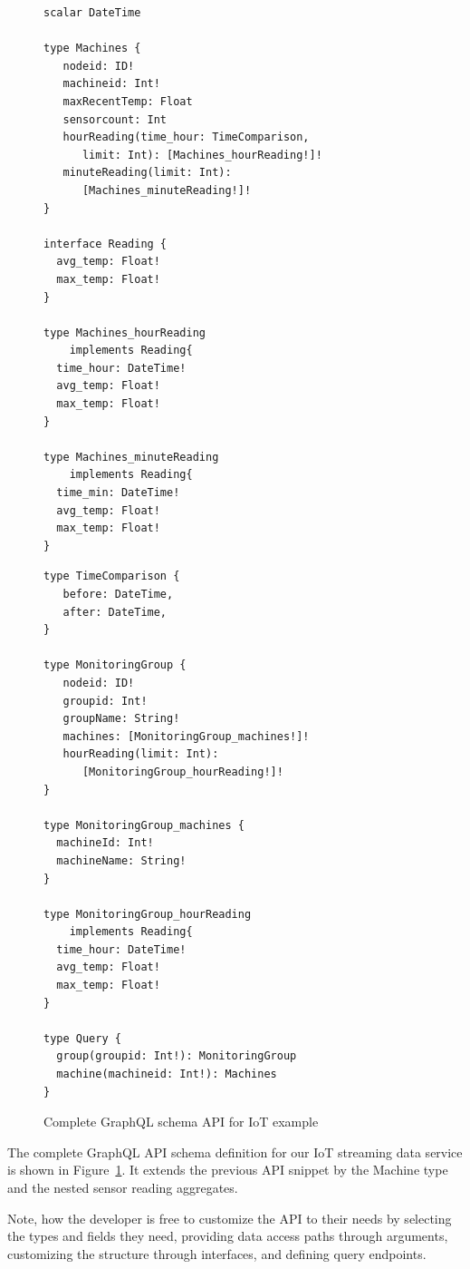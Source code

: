 \documentclass[	DIV=calc,%
							paper=letter,%
							fontsize=11pt,%
							twocolumn]{scrartcl}	 					%
\begin{document}
\begin{figure}[!ht]
    \begin{minipage}[l]{1.0\columnwidth}
        \centering
        \begin{lstlisting}
scalar DateTime

type Machines {
   nodeid: ID!
   machineid: Int!
   maxRecentTemp: Float
   sensorcount: Int
   hourReading(time_hour: TimeComparison,
      limit: Int): [Machines_hourReading!]!
   minuteReading(limit: Int):
      [Machines_minuteReading!]!
}

interface Reading {
  avg_temp: Float!
  max_temp: Float!
}

type Machines_hourReading
    implements Reading{
  time_hour: DateTime!
  avg_temp: Float!
  max_temp: Float!
}

type Machines_minuteReading
    implements Reading{
  time_min: DateTime!
  avg_temp: Float!
  max_temp: Float!
}
    \end{lstlisting}
    \end{minipage}
    \hfill{}
    \begin{minipage}[r][][b]{1.0\columnwidth}
    \centering
    \begin{lstlisting}
type TimeComparison {
   before: DateTime,
   after: DateTime,
}

type MonitoringGroup {
   nodeid: ID!
   groupid: Int!
   groupName: String!
   machines: [MonitoringGroup_machines!]!
   hourReading(limit: Int):
      [MonitoringGroup_hourReading!]!
}

type MonitoringGroup_machines {
  machineId: Int!
  machineName: String!
}

type MonitoringGroup_hourReading
    implements Reading{
  time_hour: DateTime!
  avg_temp: Float!
  max_temp: Float!
}

type Query {
  group(groupid: Int!): MonitoringGroup
  machine(machineid: Int!): Machines
}
    \end{lstlisting}
    \end{minipage}
\caption{Complete GraphQL schema API for IoT example}
\label{fig:complete_api}
\end{figure}

The complete GraphQL API schema definition for our IoT streaming data service is shown in Figure~\ref{fig:complete_api}. It extends the previous API snippet by the Machine type and the nested sensor reading aggregates.

Note, how the developer is free to customize the API to their needs by selecting the types and fields they need, providing data access paths through arguments, customizing the structure through interfaces, and defining query endpoints.
\end{document}
